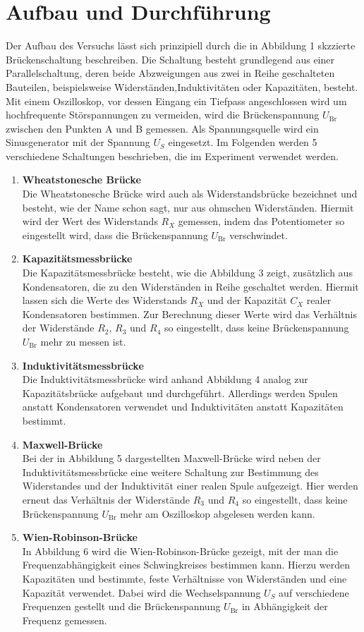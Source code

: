 \newpage
\section{Aufbau und Durchführung}
Der Aufbau des Versuchs lässt sich prinzipiell durch die in Abbildung 1 skzzierte Brückenschaltung beschreiben.
Die Schaltung besteht grundlegend aus einer Parallelschaltung, deren beide Abzweigungen aus zwei in Reihe geschalteten Bauteilen, beispielsweise Widerständen,Induktivitäten oder Kapazitäten, besteht.
Mit einem Oszilloskop, vor dessen Eingang ein Tiefpass angeschlossen wird um hochfrequente Störspannungen zu vermeiden, wird die Brückenspannung $U_\text{Br}$ zwischen den Punkten A und B gemessen.
Als Spannungsquelle wird ein Sinusgenerator mit der Spannung $U_S$ eingesetzt.
Im Folgenden werden 5 verschiedene Schaltungen beschrieben, die im Experiment verwendet werden.

\renewcommand{\labelenumi}{\alph{enumi})}
\begin{enumerate}
\item \textbf{Wheatstonesche Brücke} \\
Die Wheatstonesche Brücke wird auch als Widerstandsbrücke bezeichnet und besteht, wie der Name schon sagt, nur aus ohmschen Widerständen.
Hiermit wird der Wert des Widerstands $R_X$ gemessen, indem das Potentiometer so eingestellt wird, dass die Brückenspannung $U_\text{Br}$ verschwindet.
\item  \textbf{Kapazitätsmessbrücke} \\
Die Kapazitätsmessbrücke besteht, wie die Abbildung 3 zeigt, zusätzlich aus Kondensatoren, die zu den Widerständen in Reihe geschaltet werden.
Hiermit lassen sich die Werte des Widerstands $R_X$ und der Kapazität $C_X$ realer Kondensatoren bestimmen.
Zur Berechnung dieser Werte wird das Verhältnis der Widerstände $R_2$, $R_3$ und $R_4$ so eingestellt, dass keine Brückenspannung $U_\text{Br}$ mehr zu messen ist.
\item \textbf{Induktivitätsmessbrücke} \\
Die Induktivitätsmessbrücke wird anhand Abbildung 4 analog zur Kapazitätsbrücke aufgebaut und durchgeführt.
Allerdings werden Spulen anstatt Kondensatoren verwendet und Induktivitäten anstatt Kapazitäten bestimmt.
\item \textbf{Maxwell-Brücke} \\
Bei der in Abbildung 5 dargestellten Maxwell-Brücke wird neben der Induktivitätsmessbrücke eine weitere Schaltung zur Bestimmung des Widerstandes und der Induktivität einer realen Spule aufgezeigt.
Hier werden erneut das Verhältnis der Widerstände $R_3$ und $R_4$ so eingestellt, dass keine Brückenspannung $U_\text{Br}$ mehr am Oszilloskop abgelesen werden kann.
\item \textbf{Wien-Robinson-Brücke} \\
In Abbildung 6 wird die Wien-Robinson-Brücke gezeigt, mit der man die Frequenzabhängigkeit eines Schwingkreises bestimmen kann.
Hierzu werden Kapazitäten und bestimmte, feste Verhältnisse von Widerständen und eine Kapazität verwendet.
Dabei wird die Wechselspannung $U_S$ auf verschiedene Frequenzen gestellt und die Brückenspannung $U_\text{Br}$ in Abhängigkeit der Frequenz gemessen.
\end{enumerate}
